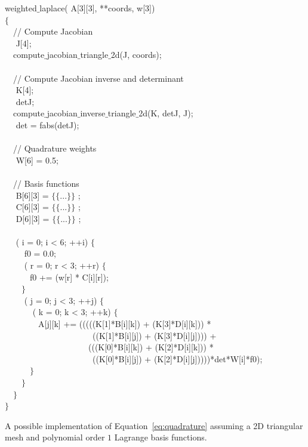 \begin{algorithm}
\scriptsize\ttfamily
{}

 weighted$\_$laplace( A[3][3],  **coords,  w[3]) \\
$\lbrace$ \\
~~// Compute Jacobian \\
~~ J[4]; \\
~~compute$\_$jacobian$\_$triangle$\_$2d(J, coords); \\
~~\\
~~// Compute Jacobian inverse and determinant \\
~~ K[4]; \\
~~ detJ; \\
~~compute$\_$jacobian$\_$inverse$\_$triangle$\_$2d(K, detJ, J); \\
~~ det = fabs(detJ); \\
~~\\
~~// Quadrature weights \\
~~ W[6] = {0.5}; \\
~~\\
~~// Basis functions \\
~~ B[6][3] = $\lbrace\lbrace$...$\rbrace\rbrace$ ;\\
~~ C[6][3] = $\lbrace\lbrace$...$\rbrace\rbrace$ ;\\
~~ D[6][3] = $\lbrace\lbrace$...$\rbrace\rbrace$ ;\\
~~\\
~~ ( i = 0; i < 6; ++i) $\lbrace$ \\
~~~~ f0  = 0.0;\\
~~~~ ( r  = 0; r < 3; ++r) $\lbrace$ \\
~~~~~~f0 += (w[r] * C[i][r]);\\
~~~~$\rbrace$ \\
~~~~ ( j = 0; j < 3; ++j) $\lbrace$\\
~~~~~~ ( k = 0; k < 3; ++k) $\lbrace$\\
~~~~~~~~A[j][k] += (((((K[1]*B[i][k]) + (K[3]*D[i][k])) * \\
~~~~~~~~~~~~~~~~~~~~~((K[1]*B[i][j]) + (K[3]*D[i][j]))) + \\
~~~~~~~~~~~~~~~~~~~~(((K[0]*B[i][k]) + (K[2]*D[i][k])) * \\
~~~~~~~~~~~~~~~~~~~~~((K[0]*B[i][j]) + (K[2]*D[i][j]))))*det*W[i]*f0);\\
~~~~~~$\rbrace$\\
~~~~$\rbrace$\\
~~$\rbrace$\\
$\rbrace$
\caption{A possible implementation of Equation~\ref{eq:quadrature} assuming a 2D triangular mesh and polynomial order $1$ Lagrange basis functions.}
\label{code:weighted-laplace}
\end{algorithm}

